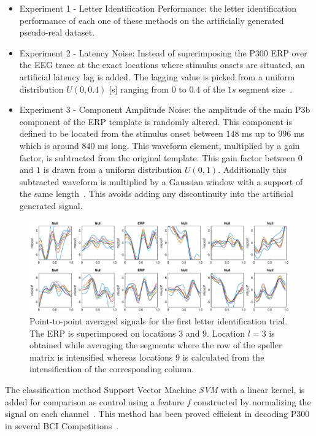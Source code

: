 \begin{itemize}
\item Experiment 1 - Letter Identification Performance: the letter identification performance of each one of these methods on the artificially generated pseudo-real dataset.
\item Experiment 2 - Latency Noise:  Instead of superimposing the P300 ERP over the EEG trace at the exact locations where stimulus onsets are situated, an artificial latency lag is added.  The lagging value is picked from a uniform distribution $U(0,0.4)$ [s] ranging from $0$ to $0.4$ of the $1s$ segment size~\cite{DaPelo2018}.
\item Experiment 3 - Component Amplitude Noise: the amplitude of the main P3b component of the ERP template is randomly altered.  This component is defined to be located from the stimulus onset between $148$ ms up to $996$ ms which is around $840$ ms long.  This waveform element, multiplied by a gain factor, is subtracted from the original template.  This gain factor between $0$ and $1$ is drawn from a uniform distribution $U(0,1)$.  Additionally this subtracted waveform is multiplied by a Gaussian window with a support of the same length~\cite{Harris1978}.  This avoids adding any discontinuity into the artificial generated signal.
\end{itemize}


\begin{figure}[h!]
\centering
\includegraphics[width=1.0\linewidth]{images/GainCheck.eps}
\caption[P300 Averaged Segments for a single-intensification sequence]{Point-to-point averaged signals for the first letter identification trial.  The ERP is superimposed on locations 3 and 9.  Location $l=3$ is obtained while averaging the segments where the row of the speller matrix is intensified whereas locations 9 is calculated from the intensification of the corresponding column.}
\label{fig:gaincheck}
\end{figure}

The classification method Support Vector Machine \textit{SVM} with a linear kernel, is added for comparison as control using a feature $f$ constructed by normalizing the signal on each channel~\cite{Krusienski2006}.  This method has been proved efficient in decoding P300 in several BCI Competitions~\cite{Kaper2004}. 

